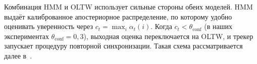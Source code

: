 Комбинация HMM и OLTW использует сильные стороны обеих моделей. HMM
выдаёт калиброванное апостериорное распределение, по которому удобно
оценивать уверенность через
$c_t = \max_i\alpha_t(i)$. Когда $c_t<\theta_{\text{conf}}$
(в наших экспериментах $\theta_{\text{conf}}=0{,}3$), выходная оценка
переключается на OLTW, и трекер запускает процедуру повторной
синхронизации. Такая схема рассматривается далее в~.
